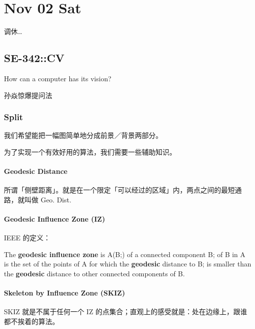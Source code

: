 \documentclass[
]{article}
\date{}
\begin{document}
\hypertarget{header-n0}{%
\section{Nov 02 Sat}\label{header-n0}}

调休\ldots{}

\hypertarget{header-n3}{%
\subsection{SE-342::CV}\label{header-n3}}

How can a computer has its vision?

孙焱惊爆提问法

\hypertarget{header-n6}{%
\subsubsection{Split}\label{header-n6}}

我们希望能把一幅图简单地分成前景／背景两部分。

为了实现一个有效好用的算法，我们需要一些辅助知识。

\hypertarget{header-n9}{%
\paragraph{Geodesic Distance}\label{header-n9}}

所谓「侧壁距离」。就是在一个限定「可以经过的区域」内，两点之间的最短通路，就叫做
Geo. Dist.

\hypertarget{header-n11}{%
\paragraph{Geodesic Influence Zone (IZ)}\label{header-n11}}

IEEE 的定义：

The \textbf{geodesic influence zone} is A(B;) of a connected component
B; of B in A is the set of the points of A for which the
\textbf{geodesic} distance to B; is smaller than the \textbf{geodesic}
distance to other connected components of B.

\hypertarget{header-n14}{%
\paragraph{Skeleton by Influence Zone (SKIZ)}\label{header-n14}}

SKIZ 就是不属于任何一个 IZ
的点集合；直观上的感受就是：处在边缘上，跟谁都不挨着的算法。
\end{document}
